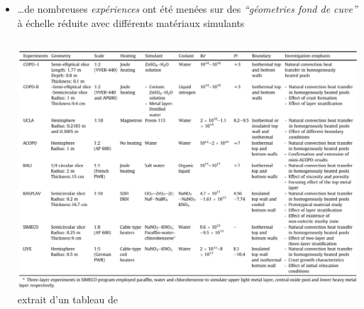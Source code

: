 \begin{frame}[fragile]
\begin{itemize}
\item \dots de nombreuses \emph{expériences} ont été menées sur des  \emph{``géometries fond de cuve''} à échelle réduite avec différents matériaux simulants
\begin{columns}[T]
    \begin{column}{0.72\textwidth}
      \includegraphics[height=0.8\textheight]{Figures/Tab3_Zhang2015.eps} \\
      {\tiny extrait d'un tableau de \cite{Zhang2015}}
    \end{column}
\end{columns}
\end{itemize}
\end{frame}
